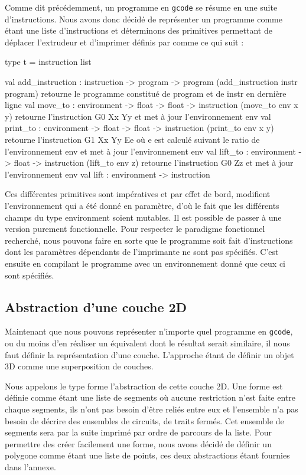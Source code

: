 \documentclass[11pt, titlepage]{article}
\begin{document}
Comme dit précédemment, un programme en \verb&gcode& se résume en une suite d'instructions. Nous avons donc décidé de représenter un programme comme étant une liste d'instructions et déterminons des primitives permettant de déplacer l'extrudeur et d'imprimer définis par comme ce qui suit :

\begin{lstisting}
type t = instruction list

val add_instruction : instruction -> program -> program
(add_instruction instr program) retourne le programme constitué de program et de instr en dernière ligne
val move_to : environment -> float -> float -> instruction
(move_to env x y) retourne l'instruction G0 Xx Yy et met à jour l'environnement env
val print_to : environment -> float -> float -> instruction  
(print_to env x y) retourne l'instruction G1 Xx Yy Ee où e est calculé suivant le ratio de l'environnement env et met à jour l'environnement env 
val lift_to : environment -> float -> instruction
(lift_to env z) retourne l'instruction G0 Zz et met à jour l'environnement env
val lift : environment -> instruction
\end{lstisting}

Ces différentes primitives sont impératives et par effet de bord, modifient l'environnement qui a été donné en paramètre, d'où le fait que les différents champs du type environment soient mutables.
Il est possible de passer à une version purement fonctionnelle. Pour respecter le paradigme fonctionnel recherché, nous pouvons faire en sorte que le programme soit fait d'instructions dont les paramètres dépendants de l'imprimante ne sont pas spécifiés. C'est ensuite en compilant le programme avec un environnement donné que ceux ci sont spécifiés.

\subsection{Abstraction d'une couche 2D}
Maintenant que nous pouvons représenter n'importe quel programme en \verb&gcode&, ou du moins d'en réaliser un équivalent dont le résultat serait similaire, il nous faut définir la représentation d'une couche. L'approche étant de définir un objet 3D comme une superposition de couches.
\newline

Nous appelons le type forme l'abstraction de cette couche 2D.
Une forme est définie comme étant une liste de segments où aucune restriction n'est faite entre chaque segments, ils n'ont pas besoin d'être reliés entre eux et l'ensemble n'a pas besoin de décrire des ensembles de circuits, de traits fermés. Cet ensemble de segments sera par la suite imprimé par ordre de parcours de la liste.
Pour permettre des créer facilement une forme, nous avons décidé de définir un polygone comme étant une liste de points, ces deux abstractions étant fournies dans l'annexe.
\newline
\end{document}
